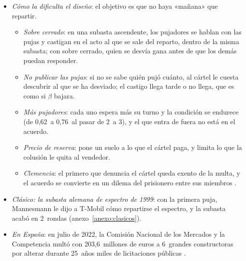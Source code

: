 \documentclass[11pt]{article}
\begin{document}
\begin{itemize}
\item \emph{Cómo la dificulta el diseño}: el objetivo es que no haya «mañana» que repartir.
  \begin{itemize}
  \item \emph{Sobre cerrado}: en una subasta ascendente, los pujadores se hablan con las pujas y castigan en el acto al que se sale del reparto, dentro de la misma subasta; con sobre cerrado, quien se desvía gana antes de que los demás puedan responder\nocite{Klemperer2002WhatReallyMatters}.
  \item \emph{No publicar las pujas}: si no se sabe quién pujó cuánto, al cártel le cuesta descubrir al que se ha desviado; el castigo llega tarde o no llega, que es como si $\beta$ bajara.
  \item \emph{Más pujadores}: cada uno espera más su turno y la condición se endurece (de 0,62~a 0,76~al pasar de 2~a 3), y el que entra de fuera no está en el acuerdo.
  \item \emph{Precio de reserva}: pone un suelo a lo que el cártel paga, y limita lo que la colusión le quita al vendedor.
  \item \emph{Clemencia}: el primero que denuncia el cártel queda exento de la multa, y el acuerdo se convierte en un dilema del prisionero entre sus miembros  .
  \end{itemize}
\item \emph{Clásico: la subasta alemana de espectro de 1999}\nocite{Klemperer2002WhatReallyMatters}: con la primera puja, Mannesmann le dijo a T-Mobil cómo repartirse el espectro, y la subasta acabó en 2~rondas (anexo~\ref{anexo:clasicos}).
\item \emph{En España}: en julio de 2022, la Comisión Nacional de los Mercados y la Competencia multó con 203,6~millones de euros a 6~grandes constructoras por alterar durante 25~años miles de licitaciones públicas\nocite{CNMC2022Constructoras} .
\end{itemize}
\end{document}
